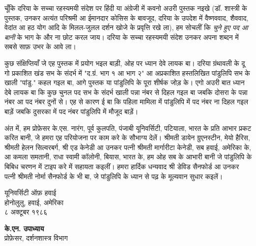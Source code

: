 चूँकि दरिया के सच्चा रहस्यमयी संदेश पर हिंदी या अंग्रेजी में कवनो अउरी पुस्तक नइखे (डॉ. शास्त्री के पुस्तक, उनकर अत्यंत परिश्रमी आ ईमानदार कोसिस के बावजूद, दरिया के उपदेश में वैष्णववाद, शैववाद, वेदांत आ हठ योग आदि के मिलल-जुलल दर्शन खोजे के प्रवृत्ति रखे ला), हम सोचलीं कि \textit{चुने हुए पद आ बानी} के भाग के और ना छोट करल जाय। दरिया के सच्चा रहस्यमयी संदेश उनकर अपना शब्दन में सबसे साफ़ उभर के आवे ला।

कुछ संक्षिप्तियाँ जे एह पुस्तक में प्रयोग भइल बाड़ी, ओह पर ध्यान देवे लायक बा। दरिया ग्रंथावली के दू गो प्रकाशित खंड सभ के संदर्भ में "द.ग्रं. भाग १ आ भाग २" आ अप्रकाशित हस्तलिखित पांडुलिपि सभ के खाली "पांडु." कहल गइल बा, आगे पुस्तक या पांडुलिपि के पूरा शीर्षक जोड़ के। एगो अउरी बात ध्यान देबे लायक बा कि कुछ चुनल पद सभ के संदर्भ खाली पन्ना नंबर से दिहल गइल बा जबकि दोसरा के पन्ना नंबर आ पद नंबर दुनों से। एह से कारण ई बा कि पहिला मामिला में पांडुलिपि में पद नंबर ना दिहल गइल बाड़ें जबकि दुसरका में पद नंबर पांडुलिपि में मौजूद बाड़ें।

अंत में, हम प्रोफ़ेसर के.एस. नारंग, पूर्व कुलपति, पंजाबी यूनिवर्सिटी, पटियाला, भारत के प्रति आभार प्रकट करित बानी, जे हमरा एह परियोजना पर काम करे के सौभाग्य देलें। श्रीमती डायेन ग्रुएनस्टीन, मेयो हैरिस, श्रीमती हेलन सिल्वरबर्ग, श्री एड केनेडी आ उनकर पत्नी श्रीमती मार्गारीटा केनेडी, सब हवाई, अमेरिका के, आ कमला समतानी, राधा स्वामी कॉलोनी, बियास, भारत के, हम ओह सब के आभारी बानी जे पांडुलिपि के बिबिध चरणन में टाइप करे में सहायता कइलीं। हमरा हार्दिक धन्यवाद श्री डेविड सैनफोर्ड आ उनकर पत्नी श्रीमती नोर्मा सैनफोर्ड के भी बा, जे पांडुलिपि के ध्यान से पढ़ के मूल्यवान सुधार कइलें।

\begin{flushright}
यूनिवर्सिटी ऑफ़ हवाई\\
होनोलुलु, हवाई, अमेरिका\\
८ अक्टूबर १९८६

{\bfseries के.एन. उपाध्याय}\\
{\small प्रोफ़ेसर, दर्शनशास्त्र विभाग}
\end{flushright}
